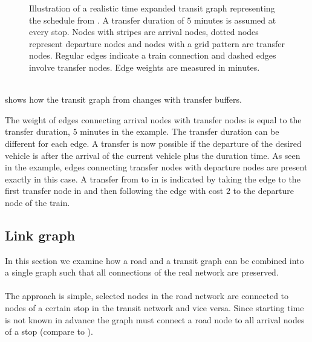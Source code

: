 \begin{figure}[!ht]
\begin{center}
		\end{center}
		\caption{Illustration of a realistic time expanded transit graph representing the schedule from .
			A transfer duration of $5$ minutes is assumed at every stop. Nodes with stripes are arrival nodes, dotted nodes
			represent departure nodes and nodes with a grid pattern are transfer nodes. Regular edges indicate a train
			connection and dashed edges involve transfer nodes. Edge weights are measured in minutes.}
		\label{realisticTransitGraphExample}
	\end{figure}\quad\\
	 shows how the transit graph from  changes with transfer buffers.

	The weight of edges connecting arrival nodes with transfer nodes is equal to the transfer duration, $5$ minutes in the example.
	The transfer duration can be different for each edge. A transfer is now possible if the departure of the desired vehicle is after
	the arrival of the current vehicle plus the duration time. As seen in the example, edges connecting transfer nodes with departure
	nodes are present exactly in this case. A transfer from \ticef to \tregios in \offenburg is indicated by taking the edge to the
	first transfer node in \offenburg and then following the edge with cost $2$ to the departure node of the train.
\subsection{Link graph}
	In this section we examine how a road and a transit graph can be combined into a single graph such that all
	connections of the real network are preserved.\\\\
	The approach is simple, selected nodes in the road network are connected to nodes of a certain stop in
	the transit network and vice versa. Since starting time is not known in advance the graph must connect a
	road node to all arrival nodes of a stop (compare to ).
	
